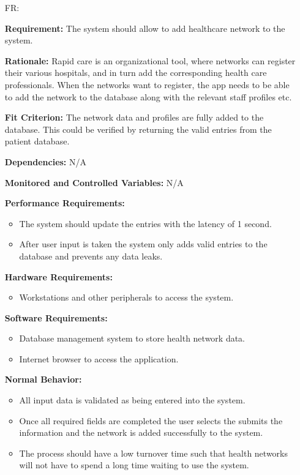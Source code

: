 \documentclass[12pt]{article}
\newcounter{reqnum} %
\begin{document}
\noindent \begin{itemize}

\item [FR\refstepcounter{reqnum}\thereqnum \label{FR_addHealthNetwork}:] 

\textbf{Requirement:} The system should allow to add healthcare network to the system. 

\textbf{Rationale:} Rapid care is an organizational tool, where networks can register their various hospitals, and in turn add the corresponding health care professionals. When the networks want to register, the app needs to be able to add the network to the database along with the relevant staff profiles etc.

\textbf{Fit Criterion:} The network data and profiles are fully added to the database. This could be verified by returning the valid entries from the patient database.

\textbf{Dependencies:} N/A

\textbf{Monitored and Controlled Variables:} N/A

\textbf{Performance Requirements:} 
\begin{itemize}
  \item The system should update the entries with the latency of 1 second.
  \item After user input is taken the system only adds valid entries to the database and prevents any data leaks.
\end{itemize}

\textbf{Hardware Requirements:} 
\begin{itemize}
  \item Workstations and other peripherals to access the system.
\end{itemize}

\textbf{Software Requirements:} 
\begin{itemize}
  \item Database management system to store health network data.
  \item Internet browser to access the application.
\end{itemize}

\textbf{Normal Behavior:} 
\begin{itemize}
  \item All input data is validated as being entered into the system.
  \item Once all required fields are completed the user selects the submits the information and the network is added successfully to the system.
  \item The process should have a low turnover time such that health networks will not have to spend a long time waiting to use the system.
\end{itemize}


\end{itemize}
\end{document}

